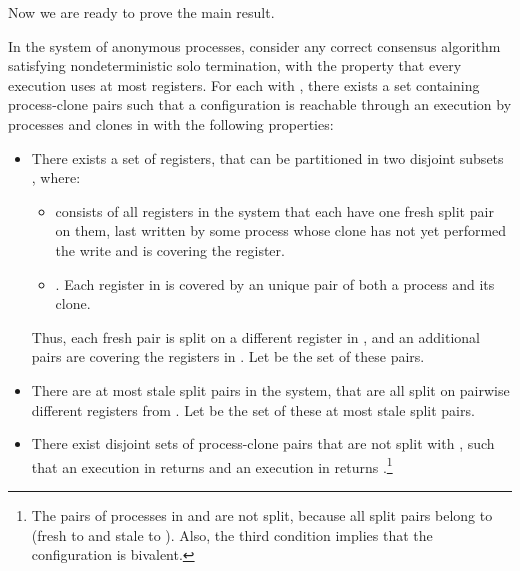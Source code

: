 Now we are ready to prove the main result.
\begin{theorem}
\label{thm:linclone}
In the system of anonymous processes, 
  consider any correct consensus algorithm satisfying nondeterministic solo termination,
  with the property that every execution uses at most  registers.
For each  with , there exists a set  containing  process-clone pairs  
  such that a configuration  is reachable through an execution  
  by processes and clones in  with the following properties:
\begin{itemize}[noitemsep, nolistsep]
\item[1.] There exists a set  of  registers, that can be partitioned in two disjoint subsets , where:
\begin{itemize}[noitemsep, nolistsep]
\item  consists of all registers in the system that each have one fresh split pair on them, 
  last written by some process whose clone has not yet performed the write and is covering the register.
\item .
Each register in  is covered by an unique pair of both a process and its clone.
\end{itemize}
Thus, each fresh pair is split on a different register in ,
  and an additional  pairs are covering the registers in .
Let  be the set of these  pairs.
\item[2.] There are at most  stale split pairs in the system,
  that are all split on pairwise different registers from .
Let  be the set of these at most  stale split pairs.
\item[3.] There exist disjoint sets of process-clone pairs that are not split 
   with ,
  such that an execution in  returns  and an execution in  returns .\footnote{The pairs of processes in  and  are not split, because all split pairs belong to  (fresh to  and stale to ). Also, the third condition implies that the configuration  is bivalent.} 
\end{itemize}
\end{theorem}
